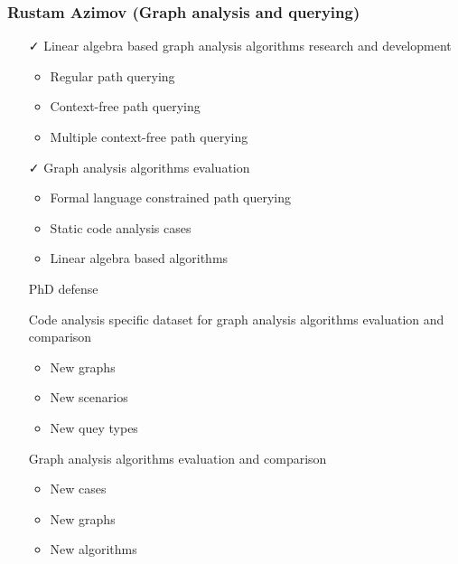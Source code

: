 \documentclass[xcolor=table,aspectratio=169]{beamer}
\begin{document}
\begin{frame}[fragile]
  \frametitle{Rustam Azimov (Graph analysis and querying)}
  \begin{minipage}[t]{0.48\textwidth}
    \begin{itemize}
      \item[\faCheck] Linear algebra based graph analysis algorithms research and development 
      \begin{itemize}
        \item Regular path querying
        \item Context-free path querying
        \item Multiple context-free path querying
      \end{itemize}      
      \item[\faCheck] Graph analysis algorithms evaluation
      \begin{itemize}
        \item Formal language constrained path querying
        \item Static code analysis cases
        \item Linear algebra based algorithms
      \end{itemize}      
      \item[\faGears] PhD defense
    \end{itemize}
  \end{minipage}
  \pause
  \begin{minipage}[t]{0.48\textwidth}
    \begin{itemize}
      \item[\faHourglassHalf] Code analysis specific dataset for graph analysis algorithms evaluation and comparison
      \begin{itemize}
        \item New graphs
        \item New scenarios
        \item New quey types
      \end{itemize}      
      \item[\faHourglassHalf] Graph analysis algorithms evaluation and comparison
      \begin{itemize}
        \item New cases
        \item New graphs
        \item New algorithms
      \end{itemize}      
    \end{itemize}
  \end{minipage}
\end{frame}
\end{document}
